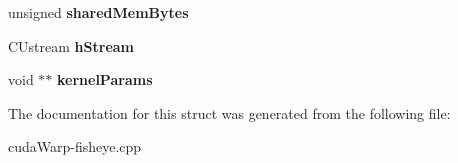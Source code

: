 \begin{DoxyCompactItemize}
\item 
unsigned {\bfseries shared\+Mem\+Bytes}\hypertarget{structCUDA__LAUNCH__PARAMS__st_a05b3d2263231bf564f8773a7dab636d8}{}\label{structCUDA__LAUNCH__PARAMS__st_a05b3d2263231bf564f8773a7dab636d8}

\item 
C\+Ustream {\bfseries h\+Stream}\hypertarget{structCUDA__LAUNCH__PARAMS__st_abb144e2be52b68b13c73eda3723ebece}{}\label{structCUDA__LAUNCH__PARAMS__st_abb144e2be52b68b13c73eda3723ebece}

\item 
void $\ast$$\ast$ {\bfseries kernel\+Params}\hypertarget{structCUDA__LAUNCH__PARAMS__st_abdec5d0cd9833cf3dc187e58f57f62e7}{}\label{structCUDA__LAUNCH__PARAMS__st_abdec5d0cd9833cf3dc187e58f57f62e7}

\end{DoxyCompactItemize}


The documentation for this struct was generated from the following file\+:\begin{DoxyCompactItemize}
\item 
cuda\+Warp-\/fisheye.\+cpp\end{DoxyCompactItemize}

